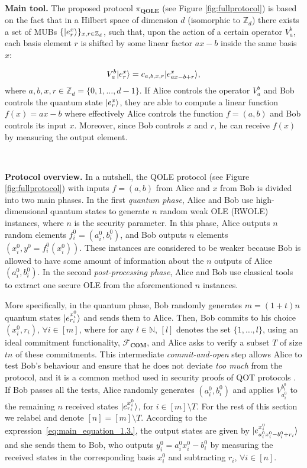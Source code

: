 \

\noindent\textbf{Main tool.} The proposed protocol $\pi_{\textbf{QOLE}}$ (see Figure \ref{fig:fullprotocol}) is based on the fact that in a Hilbert space of dimension $d$ (isomorphic to $\mathbb{Z}_d$) there exists a set of MUBs $\{| e^x_r \rangle\}_{x, r\in\mathbb{Z}_d}$, such that, upon the action of a certain operator $V^b_a$,  each basis element $r$ is shifted by some linear factor $ax - b$ inside the same basis $x$:

\begin{equation}
    V^b_a | e^x_r \rangle = c_{a,b,x, r} | e^x_{ax - b + r} \rangle,
    \label{eq:main_equation_1.3.}
\end{equation}
where $a, b, x, r \in \mathbb{Z}_d =\{0,1,\ldots,d-1\}$. If Alice controls the operator $V^b_a$ and Bob controls the quantum state $| e^x_r \rangle$, they are able to compute a linear function $f(x) = ax - b$ where effectively Alice controls the function $f = (a, b)$ and Bob controls its input $x$. Moreover, since Bob controls $x$ and $r$, he can receive $f(x)$ by measuring the output element. 

\

\noindent\textbf{Protocol overview.} In a nutshell, the QOLE protocol (see Figure \ref{fig:fullprotocol}) with inputs $f = (a,b)$ from Alice and $x$ from Bob is divided into two main phases. In the first \textit{quantum phase}, Alice and Bob use high-dimensional quantum states to generate $n$ random weak OLE (RWOLE) instances, where $n$ is the security parameter.  In this phase, Alice  outputs  $n$ random elements $f^0_i = (a^0_i, b^0_i)$, and Bob  outputs $n$ elements $(x^0_i, y^0 = f^0_i(x^0_i))$. These instances are considered to be weaker because Bob is allowed to have some amount of information about the $n$ outputs of Alice $(a^0_i, b^0_i)$. In the second \textit{post-processing phase}, Alice and Bob use classical tools to extract one secure OLE from the aforementioned $n$ instances.

More specifically, in the quantum phase, Bob randomly generates $m=(1 + t)n$ quantum states $| e^{x^0_i}_{r_i} \rangle$ and sends them to Alice. Then, Bob commits to his choice $(x^0_i, r_i)$, $\forall i\in [m]$, where for any $l\in\mathbb{N}$, $[l]$ denotes the set $\{1, \ldots, l\}$, using an ideal commitment functionality, $\mathcal{F}_{\textbf{COM}}$, and Alice asks to verify  a subset $T$ of size $tn$ of these commitments. This intermediate \textit{commit-and-open} step allows Alice to test Bob's behaviour and ensure that he does not deviate \textit{too much} from the protocol, and it is a common method used in security proofs of QOT protocols \cite{Unruh10, DFLSS09}. If Bob passes all the tests, Alice randomly generates $(a^0_i, b^0_i)$ and applies $V^{b^0_i}_{a^0_i}$ to the remaining $n$ received states $| e^{x^0_i}_{r_i} \rangle$,  for $i\in [m]\setminus T$.  For the rest of this section we relabel and denote $[n]=[m]\setminus T$. According to the expression~\eqref{eq:main_equation_1.3.}, the output states are given by $| e^{x^0_i}_{a^0_i x^0_i - b^0_i + r_i} \rangle$ and she sends them to Bob, who outputs $y^0_i = a^0_i x^0_i - b^0_i$ by measuring the received states in the corresponding basis $ x^0_i$ and subtracting $r_i$,  $\forall i\in [n]$. 

